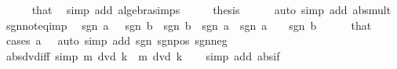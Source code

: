 \begin{isabellebody}
\ \ \ \ \isamarkupfalse%
\ that\ \isamarkupfalse%
\ {\isacharparenleft}{\kern0pt}simp\ add{\isacharcolon}{\kern0pt}\ algebra{\isacharunderscore}{\kern0pt}simps{\isacharparenright}{\kern0pt}\isanewline
\ \ \isamarkupfalse%
\ \isamarkupfalse%
\ {\isacharquery}{\kern0pt}thesis\isanewline
\ \ \ \ \isamarkupfalse%
\ {\isacharparenleft}{\kern0pt}auto\ simp\ add{\isacharcolon}{\kern0pt}\ abs{\isacharunderscore}{\kern0pt}mult{\isacharparenright}{\kern0pt}\isanewline
{}\isamarkupfalse%
%
\endisatagproof
{\isafoldproof}%
%
\isadelimproof
\isanewline
%
\endisadelimproof
\isanewline
{}\isamarkupfalse%
\ sgn{\isacharunderscore}{\kern0pt}not{\isacharunderscore}{\kern0pt}eq{\isacharunderscore}{\kern0pt}imp{\isacharcolon}{\kern0pt}\isanewline
\ \ {\isachardoublequoteopen}sgn\ a\ {\isacharequal}{\kern0pt}\ {\isacharminus}{\kern0pt}\ sgn\ b{\isachardoublequoteclose}\ \ {\isachardoublequoteopen}sgn\ b\ {\isasymnoteq}\ sgn\ a{\isachardoublequoteclose}\ \ {\isachardoublequoteopen}sgn\ a\ {\isasymnoteq}\ {}{\isachardoublequoteclose}\ \ {\isachardoublequoteopen}sgn\ b\ {\isasymnoteq}\ {}{\isachardoublequoteclose}\isanewline
%
\isadelimproof
\ \ %
\endisadelimproof
%
\isatagproof
{}\isamarkupfalse%
\ that\ \isamarkupfalse%
\ {\isacharparenleft}{\kern0pt}cases\ {\isachardoublequoteopen}a\ {\isacharless}{\kern0pt}\ {}{\isachardoublequoteclose}{\isacharparenright}{\kern0pt}\ {\isacharparenleft}{\kern0pt}auto\ simp\ add{\isacharcolon}{\kern0pt}\ sgn{\isacharunderscore}{\kern0pt}{}{\isacharunderscore}{\kern0pt}{}\ sgn{\isacharunderscore}{\kern0pt}{}{\isacharunderscore}{\kern0pt}pos\ sgn{\isacharunderscore}{\kern0pt}{}{\isacharunderscore}{\kern0pt}neg{\isacharparenright}{\kern0pt}%
\endisatagproof
{\isafoldproof}%
%
\isadelimproof
\isanewline
%
\endisadelimproof
\isanewline
{}\isamarkupfalse%
\ abs{\isacharunderscore}{\kern0pt}dvd{\isacharunderscore}{\kern0pt}iff\ {\isacharbrackleft}{\kern0pt}simp{\isacharbrackright}{\kern0pt}{\isacharcolon}{\kern0pt}\ {\isachardoublequoteopen}{\isasymbar}m{\isasymbar}\ dvd\ k\ {\isasymlongleftrightarrow}\ m\ dvd\ k{\isachardoublequoteclose}\isanewline
%
\isadelimproof
\ \ %
\endisadelimproof
%
\isatagproof
{}\isamarkupfalse%
\ {\isacharparenleft}{\kern0pt}simp\ add{\isacharcolon}{\kern0pt}\ abs{\isacharunderscore}{\kern0pt}if{\isacharparenright}{\kern0pt}%

\end{isabellebody}
